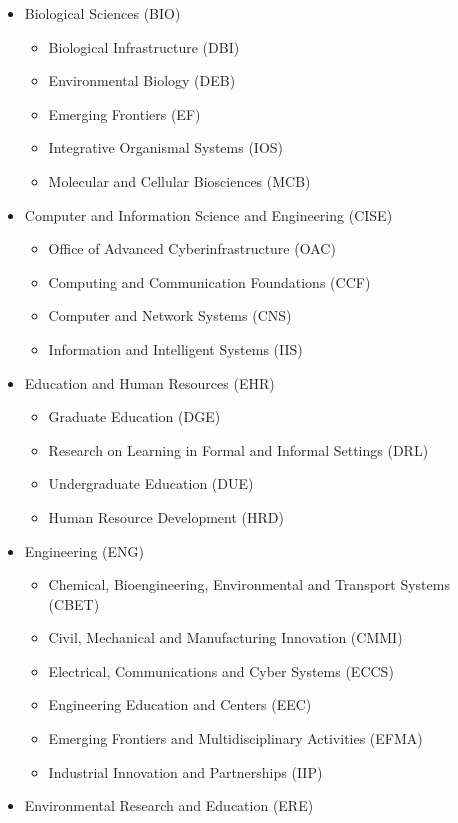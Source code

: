 \documentclass[12pt]{report}
\begin{document}
\begin{itemize}
\item Biological Sciences (BIO)
\begin{itemize}
\item[] Biological Infrastructure (DBI)
\item[] Environmental Biology (DEB)
\item[] Emerging Frontiers (EF)
\item[] Integrative Organismal Systems (IOS)
\item[] Molecular and Cellular Biosciences (MCB)
\end{itemize}
\item Computer and Information Science and Engineering (CISE)
\begin{itemize}
\item[] Office of Advanced Cyberinfrastructure (OAC)
\item[] Computing and Communication Foundations (CCF)
\item[] Computer and Network Systems (CNS)
\item[] Information and Intelligent Systems (IIS)
\end{itemize}
\item Education and Human Resources (EHR)
\begin{itemize}
\item[] Graduate Education (DGE)
\item[] Research on Learning in Formal and Informal Settings (DRL)
\item[] Undergraduate Education (DUE)
\item[] Human Resource Development (HRD)
\end{itemize}
\item Engineering (ENG)
\begin{itemize}
\item[] Chemical, Bioengineering, Environmental and Transport Systems (CBET)
\item[] Civil, Mechanical and Manufacturing Innovation (CMMI)
\item[] Electrical, Communications and Cyber Systems (ECCS)
\item[] Engineering Education and Centers (EEC)
\item[] Emerging Frontiers and Multidisciplinary Activities (EFMA)
\item[] Industrial Innovation and Partnerships (IIP)
\end{itemize}
\item Environmental Research and Education (ERE)

\end{itemize}
\end{document}
